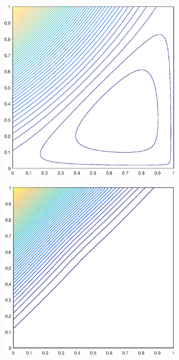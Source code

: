 \documentclass[11pt]{article}
\begin{document}
\begin{figure}
\begin{subfigure}[b]{0.25\textwidth}
		\caption{}
	\end{subfigure}
	\vfill
	\begin{subfigure}[b]{0.25\textwidth}
		\centering
		\includegraphics[width=\textwidth]{figures/square_MV2_contour_b4.eps}
		\caption{}
	\end{subfigure}
	\hspace{1cm}
	\begin{subfigure}[b]{0.25\textwidth}
		\centering
		\includegraphics[width=\textwidth]{figures/square_MAXENT2_contour_b4.eps}

\end{subfigure}
\end{figure}
\end{document}
